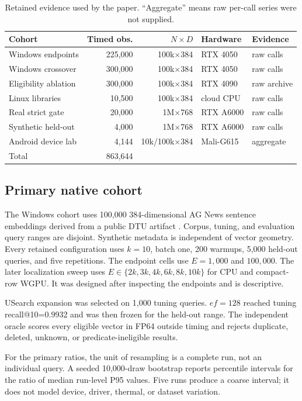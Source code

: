 \documentclass[10pt]{article}
\newcommand{\E}{E}
\begin{document}
\begin{table}[t]
\centering\small
\caption{Retained evidence used by the paper. ``Aggregate'' means raw per-call series were not supplied.}
\label{tab:inventory}
\begin{tabular}{lrrll}
\toprule
Cohort & Timed obs. & \(N\times D\) & Hardware & Evidence \\
\midrule
Windows endpoints & 225,000 & 100k$\times$384 & RTX 4050 & raw calls \\
Windows crossover & 300,000 & 100k$\times$384 & RTX 4050 & raw calls \\
Eligibility ablation & 300,000 & 100k$\times$384 & RTX 4090 & raw archive \\
Linux libraries & 10,500 & 100k$\times$384 & cloud CPU & raw calls \\
Real strict gate & 20,000 & 1M$\times$768 & RTX A6000 & raw calls \\
Synthetic held-out & 4,000 & 1M$\times$768 & RTX A6000 & raw calls \\
Android device lab & 4,144 & 10k/100k$\times$384 & Mali-G615 & aggregate \\
\midrule
Total & 863,644 & & & \\
\bottomrule
\end{tabular}
\end{table}

\subsection{Primary native cohort}
The Windows cohort uses 100,000 384-dimensional AG News sentence embeddings derived from a public DTU artifact \citep{nielsen2022agnews}. Corpus, tuning, and evaluation query ranges are disjoint. Synthetic metadata is independent of vector geometry. Every retained configuration uses \(k=10\), batch one, 200 warmups, 5,000 held-out queries, and five repetitions. The endpoint cells use \(\E=1{,}000\) and \(100{,}000\). The later localization sweep uses \(\E\in\{2k,3k,4k,6k,8k,10k\}\) for CPU and compact-row WGPU. It was designed after inspecting the endpoints and is descriptive.

USearch expansion was selected on 1,000 tuning queries. \(ef=128\) reached tuning recall@10=0.9932 and was then frozen for the held-out range. The independent oracle scores every eligible vector in FP64 outside timing and rejects duplicate, deleted, unknown, or predicate-ineligible results.

For the primary ratios, the unit of resampling is a complete run, not an individual query. A seeded 10,000-draw bootstrap reports percentile intervals for the ratio of median run-level P95 values. Five runs produce a coarse interval; it does not model device, driver, thermal, or dataset variation.
\end{document}
